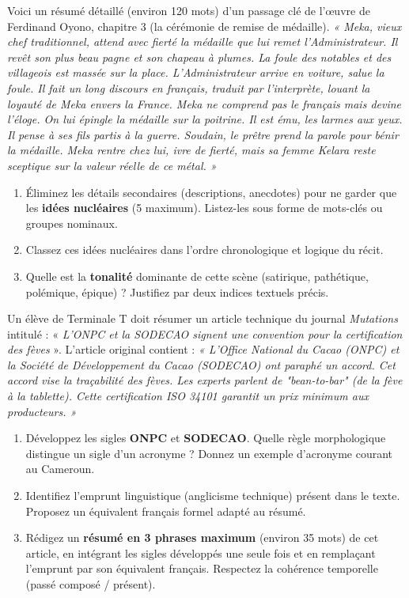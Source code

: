 \documentclass[11pt]{article}
\begin{document}
\begin{exercice}
Voici un résumé détaillé (environ 120 mots) d'un passage clé de l'œuvre de Ferdinand Oyono, chapitre 3 (la cérémonie de remise de médaille). 
\textit{« Meka, vieux chef traditionnel, attend avec fierté la médaille que lui remet l'Administrateur. Il revêt son plus beau pagne et son chapeau à plumes. La foule des notables et des villageois est massée sur la place. L'Administrateur arrive en voiture, salue la foule. Il fait un long discours en français, traduit par l'interprète, louant la loyauté de Meka envers la France. Meka ne comprend pas le français mais devine l'éloge. On lui épingle la médaille sur la poitrine. Il est ému, les larmes aux yeux. Il pense à ses fils partis à la guerre. Soudain, le prêtre prend la parole pour bénir la médaille. Meka rentre chez lui, ivre de fierté, mais sa femme Kelara reste sceptique sur la valeur réelle de ce métal. »}
\begin{enumerate}
    \item Éliminez les détails secondaires (descriptions, anecdotes) pour ne garder que les \textbf{idées nucléaires} (5 maximum). Listez-les sous forme de mots-clés ou groupes nominaux.
    \item Classez ces idées nucléaires dans l'ordre chronologique et logique du récit.
    \item Quelle est la \textbf{tonalité} dominante de cette scène (satirique, pathétique, polémique, épique) ? Justifiez par deux indices textuels précis.
\end{enumerate}
\end{exercice}

\begin{exercice}
Un élève de Terminale T doit résumer un article technique du journal \textit{Mutations} intitulé : « \textit{L'ONPC et la SODECAO signent une convention pour la certification des fèves} ».
L'article original contient : \textit{« L'Office National du Cacao (ONPC) et la Société de Développement du Cacao (SODECAO) ont paraphé un accord. Cet accord vise la traçabilité des fèves. Les experts parlent de "bean-to-bar" (de la fève à la tablette). Cette certification ISO 34101 garantit un prix minimum aux producteurs. »}
\begin{enumerate}
    \item Développez les sigles \textbf{ONPC} et \textbf{SODECAO}. Quelle règle morphologique distingue un sigle d'un acronyme ? Donnez un exemple d'acronyme courant au Cameroun.
    \item Identifiez l'emprunt linguistique (anglicisme technique) présent dans le texte. Proposez un équivalent français formel adapté au résumé.
    \item Rédigez un \textbf{résumé en 3 phrases maximum} (environ 35 mots) de cet article, en intégrant les sigles développés une seule fois et en remplaçant l'emprunt par son équivalent français. Respectez la cohérence temporelle (passé composé / présent).
\end{enumerate}
\end{exercice}
\end{document}
